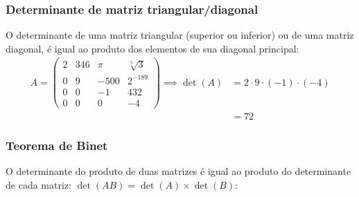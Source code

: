 \documentclass[pdftex, brazil, aspectratio=169]{beamer}
\begin{document}
\begin{frame}[t]
  \frametitle{Determinante de matriz triangular/diagonal}
  O determinante de uma matriz triangular (superior ou inferior) ou de uma
  matriz diagonal, é igual ao produto dos elementos de sua diagonal principal:
  \begin{equation*}\begin{split}A = \begin{pmatrix}
    2 & 346 & \pi & \sqrt[5]{3}\\
    0 & 9 & -500 & 2^{-189}\\
    0 & 0 & -1 & 432\\
    0 & 0 & 0 & -4\end{pmatrix} \implies \det(A) &= 2 \cdot 9 \cdot (-1) \cdot (-4)\\
                                               &=72\end{split}\end{equation*}
\end{frame}

\begin{frame}[t]
  \frametitle{Teorema de Binet}
  O determinante do produto de duas matrizes é igual ao produto do determinante
  de cada matriz: $\det(AB) = \det(A) \times \det(B)$:

\end{frame}
\end{document}
